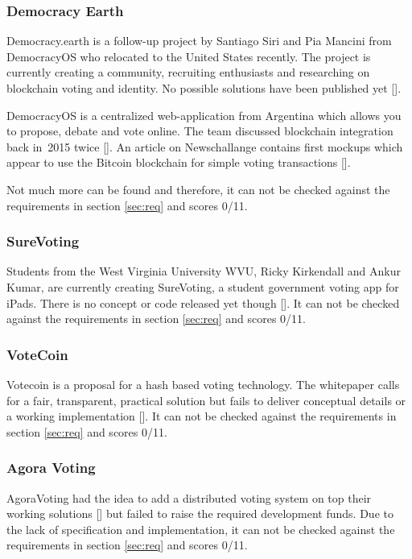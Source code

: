 \subsubsection{Democracy Earth}
Democracy.earth is a follow-up project by Santiago Siri and Pia Mancini from DemocracyOS who relocated to the United States recently. The project is currently creating a community, recruiting enthusiasts and researching on blockchain voting and identity. No possible solutions have been published yet [\cite{MANCINI2015B}].\par
DemocracyOS is a centralized web-application from Argentina which allows you to propose, debate and vote online. The team discussed blockchain integration back in~2015 twice [\cite{DEMOCRACYOS2015A,DEMOCRACYOS2015B}]. An article on Newschallange contains first mockups which appear to use the Bitcoin blockchain for simple voting transactions [\cite{MANCINI2015B}].\par
Not much more can be found and therefore, it can not be checked against the requirements in section \ref{sec:req} and scores 0/11.

\subsubsection{SureVoting}
Students from the West Virginia University WVU, Ricky Kirkendall and Ankur Kumar, are currently creating SureVoting, a student government voting app for iPads. There is no concept or code released yet though [\cite{COYNE2015}]. It can not be checked against the requirements in section \ref{sec:req} and scores 0/11.

\subsubsection{VoteCoin}
Votecoin is a proposal for a hash based voting technology. The whitepaper calls for a fair, transparent, practical solution but fails to deliver conceptual details or a working implementation [\cite{LEVEL2014}]. It can not be checked against the requirements in section \ref{sec:req} and scores 0/11.

\subsubsection{Agora Voting}
AgoraVoting had the idea to add a distributed voting system on top their working solutions [\cite{ELVIRA2013}] but failed to raise the required development funds. Due to the lack of specification and implementation, it can not be checked against the requirements in section \ref{sec:req} and scores 0/11.


